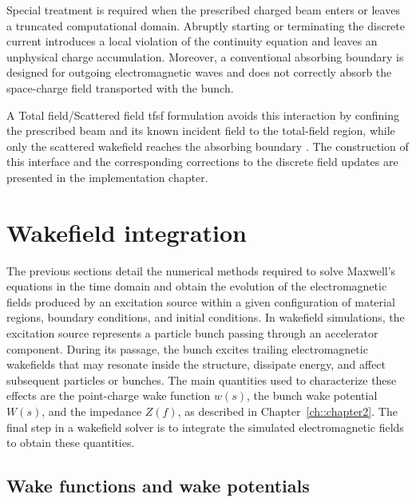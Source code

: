 Special treatment is required when the prescribed charged beam enters or leaves a truncated computational domain. Abruptly starting or terminating the discrete current introduces a local violation of the continuity equation and leaves an unphysical charge accumulation. Moreover, a conventional absorbing boundary is designed for outgoing electromagnetic waves and does not correctly absorb the space-charge field transported with the bunch. 

A Total field/Scattered field \gls{tfsf} formulation avoids this interaction by confining the prescribed
beam and its known incident field to the total-field region, while only the scattered wakefield reaches the absorbing boundary
\cite{balk_open_2006}. The construction of this interface and the corresponding
corrections to the discrete field updates are presented in the implementation chapter.


\section{Wakefield integration}
\label{sec:wakefield_integration}
The previous sections detail the numerical methods required to solve Maxwell's equations in the time domain and obtain the evolution of the electromagnetic fields produced by an excitation source within a given configuration of material regions, boundary conditions, and initial conditions. In wakefield simulations, the excitation source represents a particle bunch passing through an accelerator component. During its passage, the bunch excites trailing electromagnetic wakefields that may resonate inside the structure, dissipate energy, and affect subsequent particles or bunches. The main quantities used to characterize these effects are the point-charge wake function $w(s)$, the bunch wake potential $W(s)$, and the impedance $Z(f)$, as described in Chapter~\ref{ch::chapter2}. The final step in a wakefield solver is to integrate the simulated electromagnetic fields to obtain these quantities.

\subsection{Wake functions and wake potentials}
\label{sec:bunch_wake_potential}

